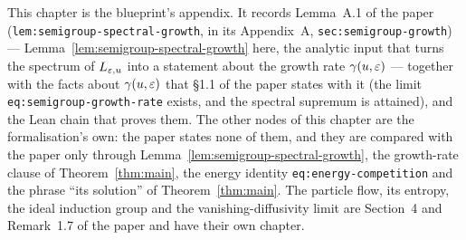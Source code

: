 This chapter is the blueprint's appendix.  It records Lemma~A.1 of the paper
(\texttt{lem:semigroup-spectral-growth}, in its Appendix~A, \texttt{sec:semigroup-growth}) ---
Lemma~\ref{lem:semigroup-spectral-growth} here, the analytic input that turns the spectrum of
$L_{\varepsilon,u}$ into a statement about the growth rate $\gamma(u,\varepsilon)$ --- together with the
facts about $\gamma(u,\varepsilon)$ that §1.1 of the paper states with it (the limit
\texttt{eq:semigroup-growth-rate} exists, and the spectral supremum is attained), and the Lean
chain that proves them.  The other nodes of this chapter are the formalisation's own: the paper
states none of them, and they are compared with the paper only through
Lemma~\ref{lem:semigroup-spectral-growth}, the growth-rate clause of Theorem~\ref{thm:main}, the
energy identity \texttt{eq:energy-competition} and the phrase ``its solution'' of
Theorem~\ref{thm:main}.  The particle flow, its entropy, the ideal induction group and the
vanishing-diffusivity limit are Section~4 and Remark~1.7 of the paper and have their own
chapter.

